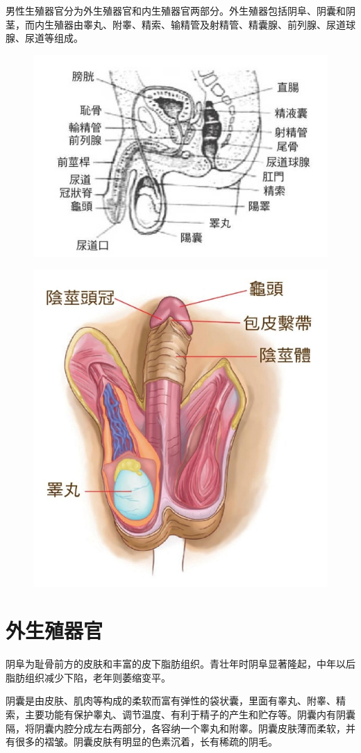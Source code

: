 \documentclass[12pt,UTF8]{ctexbook}
\begin{document}
男性生殖器官分为外生殖器官和内生殖器官两部分。外生殖器包括阴阜、阴囊和阴茎，而内生殖器由睾丸、附睾、精索、输精管及射精管、精囊腺、前列腺、尿道球腺、尿道等组成。

\begin{figure}[htbp]
	\centering
	\includegraphics[width=0.7\linewidth]{4}
	\caption{}
\end{figure}

\begin{figure}[htbp]
	\centering
	\includegraphics[width=0.7\linewidth]{13}
	\caption{}
\end{figure}

\section{外生殖器官}

阴阜为耻骨前方的皮肤和丰富的皮下脂肪组织。青壮年时阴阜显著隆起，中年以后脂肪组织减少下陷，老年则萎缩变平。

阴囊是由皮肤、肌肉等构成的柔软而富有弹性的袋状囊，里面有睾丸、附睾、精索，主要功能有保护睾丸、调节温度、有利于精子的产生和贮存等。阴囊内有阴囊隔，将阴囊内腔分成左右两部分，各容纳一个睾丸和附睾。阴囊皮肤薄而柔软，并有很多的褶皱。阴囊皮肤有明显的色素沉着，长有稀疏的阴毛。
\end{document}
